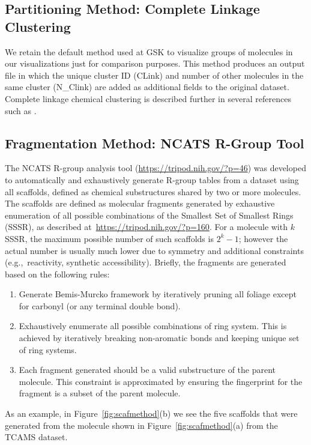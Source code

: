 \documentclass[journal=jacsat,manuscript=article]{achemso}
\newcommand*\fref[1]{Figure~\ref{fig:#1}}
\newcommand*\eg{e.g.,~}
\begin{document}
\subsection{Partitioning Method: Complete Linkage Clustering}
We retain the default method used at GSK to visualize groups of
molecules in our visualizations just for comparison purposes. This
method produces an output file in which the unique cluster ID (CLink)
and number of other molecules in the same cluster (N\_Clink) are added
as additional fields to the original dataset.  Complete linkage
chemical clustering is described further in several references such
as \citeauthor{Jain2010,Downs2003}.

\subsection{Fragmentation Method: NCATS R-Group Tool}
\label{sec:rgtool}
The NCATS R-group analysis tool (\url{https://tripod.nih.gov/?p=46})
was developed to automatically and exhaustively generate R-group
tables from a dataset using all scaffolds, defined as chemical
substructures shared by two or more molecules. The scaffolds are
defined as molecular fragments generated by exhaustive enumeration of
all possible combinations of the Smallest Set of Smallest Rings
(SSSR), as described at~\url{https://tripod.nih.gov/?p=160}. For a
molecule with $k$ SSSR, the maximum possible number of such scaffolds
is $2^k - 1$; however the actual number is usually much lower due to
symmetry and additional constraints (\eg reactivity, synthetic
accessibility). Briefly, the fragments are generated based on the
following rules:
\begin{enumerate}
  \item Generate Bemis-Murcko framework by iteratively pruning all foliage
    except for carbonyl (or any terminal double bond).
  \item Exhaustively enumerate all possible combinations of ring
    system. This is achieved by iteratively breaking non-aromatic
    bonds and keeping unique set of ring systems.
  \item Each fragment generated should be a valid substructure of the
    parent molecule. This constraint is approximated by ensuring the
    fingerprint for the fragment is a subset of the parent molecule.
\end{enumerate}

As an example, in \fref{scafmethod}(b) we see the five scaffolds that
were generated from the molecule shown in \fref{scafmethod}(a) from
the TCAMS dataset.
\end{document}
